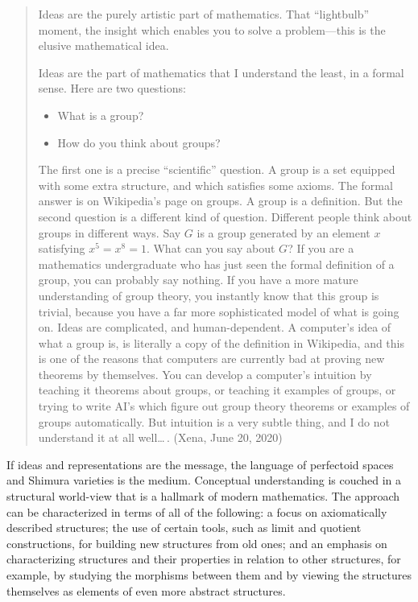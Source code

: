 \documentclass{amsart}
\theoremstyle{definition}
\theoremstyle{remark}
\numberwithin{equation}{section}
\begin{document}
\begin{quotation}
  \noindent Ideas are the purely artistic part of mathematics. That ``lightbulb'' moment, the insight which enables you to solve a problem---this is the elusive mathematical idea.

  Ideas are the part of mathematics that I understand the least, in a formal sense. Here are two questions:
  \begin{itemize}
  \item What is a group?
  \item How do you think about groups?
  \end{itemize}
  The first one is a precise ``scientific'' question. A group is a set equipped with some extra structure, and which satisfies some axioms. The formal answer is on Wikipedia's page on groups. A group is a definition. But the second question is a different kind of question. Different people think about groups in different ways. Say $G$ is a group generated by an element $x$ satisfying $x^5=x^8=1$. What can you say about $G$? If you are a mathematics undergraduate who has just seen the formal definition of a group, you can probably say nothing. If you have a more mature understanding of group theory, you instantly know that this group is trivial, because you have a far more sophisticated model of what is going on. Ideas are complicated, and human-dependent. A computer's idea of what a group is, is literally a copy of the definition in Wikipedia, and this is one of the reasons that computers are currently bad at proving new theorems by themselves. You can develop a computer's intuition by teaching it theorems about groups, or teaching it examples of groups, or trying to write AI's which figure out group theory theorems or examples of groups automatically. But intuition is a very subtle thing, and I do not understand it at all well\ldots\,. (Xena, June 20, 2020)
\end{quotation}

If ideas and representations are the message, the language of perfectoid spaces and Shimura varieties is the medium. Conceptual understanding is couched in a structural world-view that is a hallmark of modern mathematics. The approach can be characterized in terms of all of the following: a focus on axiomatically described structures; the use of certain tools, such as limit and quotient constructions, for building new structures from old ones; and an emphasis on characterizing structures and their properties in relation to other structures, for example, by studying the morphisms between them and by viewing the structures themselves as elements of even more abstract structures.
\end{document}
